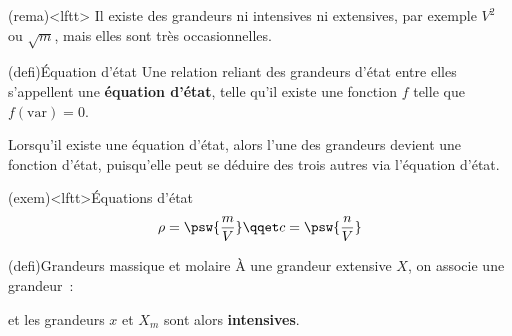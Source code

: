 \documentclass[../../main/main.tex]{subfiles}
\begin{document}
\begin{tcb}(rema)<lftt>{}
	Il existe des grandeurs ni intensives ni extensives, par exemple $V^2$ ou
	$\sqrt{m}$, mais elles sont très occasionnelles.
\end{tcb}

\begin{tcb}(defi){Équation d'état}
	Une relation reliant des grandeurs d'état entre elles s'appellent une
	\textbf{équation d'état}, telle qu'il existe une fonction $f$ telle que
	$\boxed{f(\text{var}) = 0}$.
\end{tcb}

Lorsqu'il existe une équation d'état, alors l'une des grandeurs  devient une
fonction d'état, puisqu'elle peut se déduire des trois autres via l'équation
d'état.

\begin{tcb}(exem)<lftt>{Équations d'état}
	\[
		\rho = \psw{\frac{m}{V}}
		\qqet
		c = \psw{\frac{n}{V}}
	\]
\end{tcb}

\begin{tcb*}(defi){Grandeurs massique et molaire}
	À une grandeur extensive $X$, on associe une grandeur~:
	\smallbreak
	\begin{isd}
		\psw{%
			\[
				x = \frac{X}{m}
			\]
		}%
		\vspace{-15pt}
		\tcblower
		\psw{%
			\[
				X_m = \frac{X}{n}
			\]
		}%
		\vspace{-15pt}
	\end{isd}
	et les grandeurs $x$ et $X_m$ sont alors \textbf{intensives}.
\end{tcb*}
\end{document}
